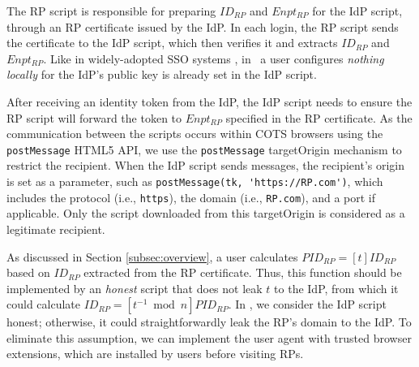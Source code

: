 The RP script is responsible for preparing $ID_{RP}$ and $Enpt_{RP}$ for the IdP script, through an RP certificate issued by the IdP. %
In each login, the RP script sends the certificate to the IdP script, which then verifies it and extracts $ID_{RP}$ and $Enpt_{RP}$.
Like in widely-adopted SSO systems \cite{OpenIDConnect, rfc6749, SAML, SAMLIdentifier}, in \usso\ a user configures \emph{nothing locally} for the IdP's public key is already set in the IdP script.

After receiving an identity token from the IdP, the IdP script needs to ensure the RP script will forward the token to $Enpt_{RP}$ %
specified in the RP certificate.
As the communication between the scripts occurs within COTS browsers using the \verb+postMessage+ HTML5 API, %
we use the \verb+postMessage+ targetOrigin mechanism \cite{postm-targeto} to restrict the recipient. %
 When the IdP script sends messages, the recipient's origin is set as a parameter, such as \verb+postMessage(tk, 'https://RP.com')+, which includes the protocol (i.e., \verb+https+), the domain (i.e., \verb+RP.com+), and a port if applicable.
Only the script downloaded from this targetOrigin is considered as a legitimate recipient.


As discussed in Section \ref{subsec:overview}, a user calculates $PID_{RP} = [t]ID_{RP}$ based on $ID_{RP}$ extracted from the RP certificate. Thus, this function should be implemented by an \emph{honest} script that does not leak $t$ to the IdP, from which it could calculate $ID_{RP} = [t^{-1}\bmod n]PID_{RP}$. In \usso, we consider the IdP script honest; otherwise, it could straightforwardly leak the RP's domain to the IdP.
To eliminate this assumption, we can implement the user agent with trusted browser extensions, which are installed by users before visiting RPs.

